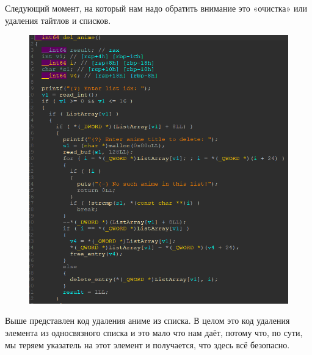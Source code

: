 \documentclass[idxtotoc,hyperref,openany,oneside]{files/pwn} %
\begin{document}
Следующий момент, на который нам надо обратить внимание это «очистка» или удаления тайтлов и списков.
\begin{figure}[H]
\begin{center}
\includegraphics[width=1.0\linewidth]{files/mal-del-anime}
\end{center}
\label{fig:mal-del-anime}
\end{figure}

Выше представлен код удаления аниме из списка. В целом это код удаления элемента из односвязного списка и это мало что нам даёт, потому что, по сути, мы теряем указатель на этот элемент и получается, что здесь всё безопасно.
\end{document}
